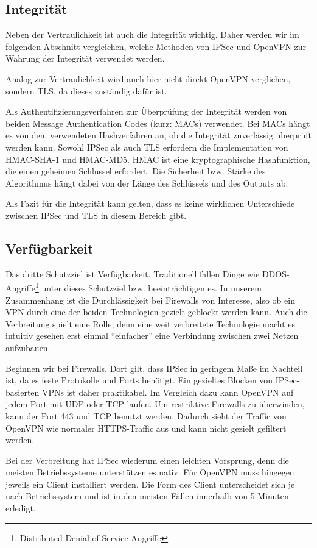\documentclass[12pt]{scrartcl}
\begin{document}
\subsection{Integrität}
Neben der Vertraulichkeit ist auch die Integrität wichtig. Daher werden wir im folgenden Abschnitt vergleichen, welche Methoden von IPSec und OpenVPN zur Wahrung der Integrität verwendet werden.

Analog zur Vertraulichkeit wird auch hier nicht direkt OpenVPN verglichen, sondern TLS, da dieses zuständig dafür ist.

Als Authentifizierungsverfahren zur Überprüfung der Integrität werden von beiden Message Authentication Codes (kurz: MACs) verwendet. Bei MACs hängt es von dem verwendeten Hashverfahren an, ob die Integrität zuverlässig überprüft werden kann. Sowohl IPSec als auch TLS erfordern die Implementation von HMAC-SHA-1 und HMAC-MD5. HMAC ist eine kryptographische Hashfunktion, die einen geheimen Schlüssel erfordert. Die Sicherheit bzw. Stärke des Algorithmus hängt dabei von der Länge des Schlüssels und des Outputs ab.\cite{Alshamsi2005}

Als Fazit für die Integrität kann gelten, dass es keine wirklichen Unterschiede zwischen IPSec und TLS in diesem Bereich gibt.

\subsection{Verfügbarkeit}
Das dritte Schutzziel ist Verfügbarkeit. Traditionell fallen Dinge wie DDOS-Angriffe\footnote{Distributed-Denial-of-Service-Angriffe} unter dieses Schutzziel bzw. beeinträchtigen es. In unserem Zusammenhang ist die Durchlässigkeit bei Firewalls von Interesse, also ob ein VPN durch eine der beiden Technologien gezielt geblockt werden kann. Auch die Verbreitung spielt eine Rolle, denn eine weit verbreitete Technologie macht es intuitiv gesehen erst einmal "`einfacher"' eine Verbindung zwischen zwei Netzen aufzubauen.

Beginnen wir bei Firewalls. Dort gilt, dass IPSec in geringem Maße im Nachteil ist, da es feste Protokolle und Ports benötigt. Ein gezieltes Blocken von IPSec-basierten VPNs ist daher praktikabel. Im Vergleich dazu kann OpenVPN auf jedem Port mit UDP oder TCP laufen. Um restriktive Firewalls zu überwinden, kann der Port 443 und TCP benutzt werden. Dadurch sieht der Traffic von OpenVPN wie normaler HTTPS-Traffic aus und kann nicht gezielt gefiltert werden.\cite{ivpn.net}

Bei der Verbreitung hat IPSec wiederum einen leichten Vorsprung, denn die meisten Betriebssysteme unterstützen es nativ. Für OpenVPN muss hingegen jeweils ein Client installiert werden. Die Form des Client unterscheidet sich je nach Betriebssystem und ist in den meisten Fällen innerhalb von 5 Minuten erledigt.\cite{ivpn.net}
\end{document}
